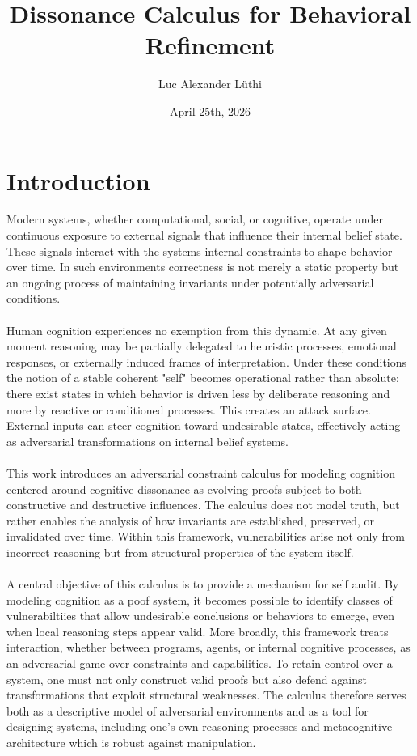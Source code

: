 \documentclass{article}
\title{Dissonance Calculus for Behavioral Refinement}
\author{Luc Alexander L{\"u}thi}
\date{April 25th, 2026}
\begin{document}
	\maketitle
	\tableofcontents
	\section{Introduction}
	Modern systems, whether computational, social, or cognitive, operate under continuous exposure to external signals that influence their internal belief state. These signals interact with the systems internal constraints to shape behavior over time. In such environments correctness is not merely a static property but an ongoing process of maintaining invariants under potentially adversarial conditions. \\\\
	Human cognition experiences no exemption from this dynamic. At any given moment reasoning may be partially delegated to heuristic processes, emotional responses, or externally induced frames of interpretation. Under these conditions the notion of a stable coherent "self" becomes operational rather than absolute: there exist states in which behavior is driven less by deliberate reasoning and more by reactive or conditioned processes. This creates an attack surface. External inputs can steer cognition toward undesirable states, effectively acting as adversarial transformations on internal belief systems.\\\\
	This work introduces an adversarial constraint calculus for modeling cognition centered around cognitive dissonance as evolving proofs subject to both constructive and destructive influences. The calculus does not model truth, but rather enables the analysis of how invariants are established, preserved, or invalidated over time. Within this framework, vulnerabilities arise not only from incorrect reasoning but from structural properties of the system itself.\\\\
	A central objective of this calculus is to provide a mechanism for self audit. By modeling cognition as a poof system, it becomes possible to identify classes of vulnerabiltiies that allow undesirable conclusions or behaviors to emerge, even when local reasoning steps appear valid. More broadly, this framework treats interaction, whether between programs, agents, or internal cognitive processes, as an adversarial game over constraints and capabilities. To retain control over a system, one must not only construct valid proofs but also defend against transformations that exploit structural weaknesses. The calculus therefore serves both as a descriptive model of adversarial environments and as a tool for designing systems, including one's own reasoning processes and metacognitive architecture which is robust against manipulation.\\\\
\end{document}
